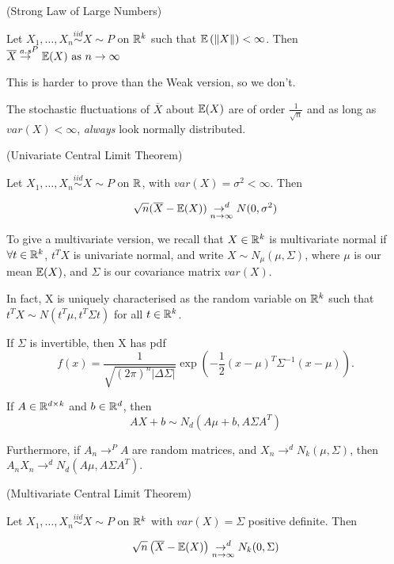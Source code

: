 \documentclass[a4paper]{article}
\begin{document}
\begin{thm}
	(Strong Law of Large Numbers)

	Let $X_1, \ldots, X_n \stackrel{iid}{\sim} X \sim P$ on $\mathbb{R}^{k}$ such that $\mathbb{E}\left(\|X\|  \right)  < \infty$. Then $\overline{X} \overset{a.s}{\to}^{P} \mathbb{E}(X) \text{ as } n \to \infty$
\end{thm}

This is harder to prove than the Weak version, so we don't.

The stochastic fluctuations of $\overline{X}$ about $\mathbb{E}(X)$ are of order $\frac{1}{\sqrt{n} }$ and as long as $var(X) < \infty$, \textit{always} look normally distributed.

\begin{thm}
	(Univariate Central Limit Theorem)

	Let $X_1, \ldots, X_n \stackrel{iid}{\sim} X \sim P$ on $\mathbb{R}$, with $var(X) = \sigma^2 < \infty$. Then

	\[
		\sqrt{n} (\overline{X} - \mathbb{E}(X)) \underset{n \to  \infty}{\to^{d}} N(0, \sigma^2)
	\] 
\end{thm}

To give a multivariate version, we recall that $X \in \mathbb{R}^{k}$ is multivariate normal if $\forall t \in \mathbb{R}^{k}$, $t^{T}X$ is univariate normal, and write $X\sim N_{\mu}(\mu, \Sigma)$, where $\mu$ is our mean  $\mathbb{E}(X)$, and  $\Sigma $ is our covariance matrix $var(X)$.

In fact, X is uniquely characterised as the random variable on  $\mathbb{R}^{k}$ such that $t ^{T}X \sim N(t ^{T}\mu, t ^{T}\Sigma t)$ for all $t \in \mathbb{R}^{k}$.

If $\Sigma$ is invertible, then X has pdf
\[
	f(x) = \frac{1}{\sqrt{(2\pi)^{n}|\Delta \Sigma|} } \exp\left( - \frac{1}{2} (x-\mu)^{T} \Sigma^{-1} (x - \mu) \right) 
.\] 

If $A \in \mathbb{R}^{d\times k}$ and $b \in \mathbb{R}^{d}$, then
\[
	AX + b \sim N_{d}\left( A\mu + b, A\Sigma A^{T} \right) 
\] 

Furthermore, if $A_{n} \to^{P} A$ are random matrices, and $X_n \to ^{d} N_{k}\left( \mu, \Sigma \right) $, then $A_n X_n \to ^{d} N_{d}\left( A\mu, A\Sigma A^{T} \right) $.

\begin{thm}
	(Multivariate Central Limit Theorem)

	Let $X_1, \ldots, X_n \stackrel{iid}{\sim} X \sim P$ on $\mathbb{R}^{k}$ with $var(X) = \Sigma$ positive definite. Then

	 \[
		 \sqrt{n} \left( \overline{X} - \mathbb{E}(X) \right) \underset{n \to \infty}{\to ^{d}} N_{k}(0, \Sigma)
	\] 
\end{thm}
\end{document}
